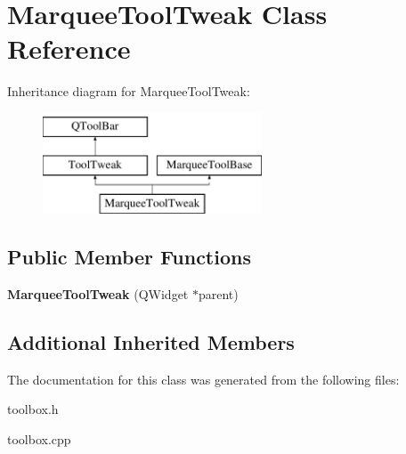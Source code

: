 \hypertarget{class_marquee_tool_tweak}{\section{Marquee\-Tool\-Tweak Class Reference}
\label{class_marquee_tool_tweak}
}
Inheritance diagram for Marquee\-Tool\-Tweak\-:\begin{figure}[H]
\begin{center}
\leavevmode
\includegraphics[height=3.000000cm]{class_marquee_tool_tweak}
\end{center}
\end{figure}
\subsection*{Public Member Functions}
\begin{DoxyCompactItemize}
\item 
\hypertarget{class_marquee_tool_tweak_ac05c2e399fc62162142b43d3bcef605a}{{\bfseries Marquee\-Tool\-Tweak} (Q\-Widget $\ast$parent)}\label{class_marquee_tool_tweak_ac05c2e399fc62162142b43d3bcef605a}

\end{DoxyCompactItemize}
\subsection*{Additional Inherited Members}


The documentation for this class was generated from the following files\-:\begin{DoxyCompactItemize}
\item 
toolbox.\-h\item 
toolbox.\-cpp\end{DoxyCompactItemize}

